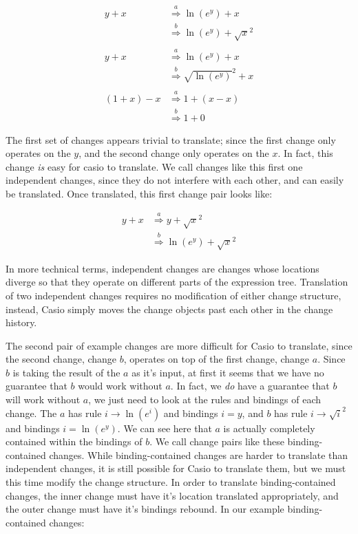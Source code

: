 \documentclass{article}
\newcommand{\insetarrow}[1]{\stackrel{#1}{\Rightarrow}}
\newcommand{\lnexp}[1]{\ln{\left(e^{#1}\right)}}
\newcommand{\sqrsqrt}[1]{\sqrt{#1}^2}
\begin{document}
\begin{align*}
\label{eq:changes}
y + x &\insetarrow{a} \lnexp{y} + x \\
&\insetarrow{b} \lnexp{y} + \sqrsqrt{x}\\ \\
y + x &\insetarrow{a} \lnexp{y} + x \\
&\insetarrow{b} \sqrsqrt{\lnexp{y}} + x\\ \\
(1 + x) - x &\insetarrow{a} 1 + (x - x) \\
&\insetarrow{b} 1 + 0
\end{align*}

The first set of changes appears trivial to translate;
since the first change only operates on the $y$,
and the second change only operates on the $x$.
In fact, this change \emph{is} easy for casio to translate.
We call changes like this first one
independent changes,
since they do not interfere with each other,
and can easily be translated.
Once translated, this first change pair looks like:

\begin{align*}
y + x &\insetarrow{a} y + \sqrsqrt{x}\\
&\insetarrow{b} \lnexp{y} + \sqrsqrt{x}
\end{align*}

In more technical terms,
independent changes are changes whose locations diverge
so that they operate on different parts of the expression tree.
Translation of two independent changes requires
no modification of either change structure,
instead, 
Casio simply moves the change objects
past each other in the change history.

The second pair of example changes
are more difficult for Casio to translate,
since the second change, change $b$,
operates on top of the first change, change $a$.
Since $b$ is taking the result of the $a$ as it's input,
at first it seems that we have no guarantee
that $b$ would work without $a$.
In fact, we \emph{do} have a guarantee 
that $b$ will work without $a$,
we just need to look at the rules and bindings of each change.
The $a$ has rule $i\to\lnexp{i}$
and bindings $i=y$,
and $b$ has rule $i\to\sqrsqrt{i}$
and bindings $i=\lnexp{y}$.
We can see here that $a$ is actually completely contained
within the bindings of $b$.
We call change pairs like these binding-contained changes.
While binding-contained changes are harder to translate than independent changes,
it is still possible for Casio to translate them,
but we must this time modify the change structure.
In order to translate binding-contained changes,
the inner change must have it's location translated appropriately,
and the outer change must have it's bindings rebound.
In our example binding-contained changes:
\end{document}

